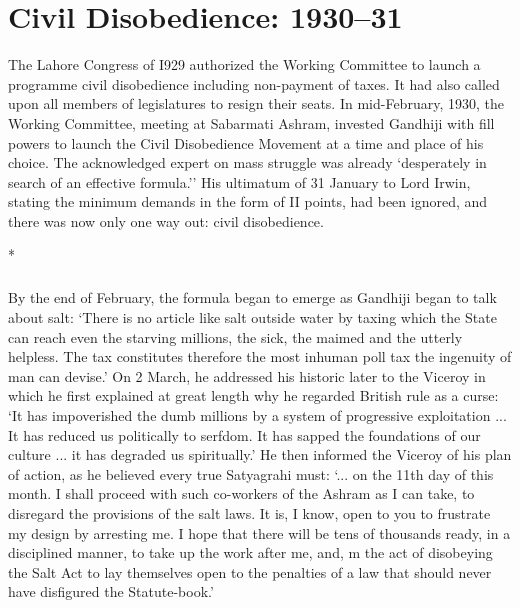 \chapter{Civil Disobedience: 1930--31}
\begin{multicols}{2}

The Lahore Congress of I929 authorized the Working Committee to launch a programme civil disobedience including non-payment of taxes. It had also called upon all members of legislatures to resign their seats. In mid-February, 1930, the Working Committee, meeting at Sabarmati Ashram, invested Gandhiji with fill powers to launch the Civil Disobedience Movement at a time and place of his choice. The acknowledged expert on mass struggle was already `desperately in search of an effective formula.'' His ultimatum of 31 January to Lord Irwin, stating the minimum demands in the form of II points, had been ignored, and there was now only one way out: civil disobedience.

\begin{center}*\end{center}

\paragraph*{}

By the end of February, the formula began to emerge as Gandhiji began to talk about salt: `There is no article like salt outside water by taxing which the State can reach even the starving millions, the sick, the maimed and the utterly helpless. The tax constitutes therefore the most inhuman poll tax the ingenuity of man can devise.' On 2 March, he addressed his historic later to the Viceroy in which he first explained at great length why he regarded British rule as a curse: `It has impoverished the dumb millions by a system of progressive exploitation ... It has reduced us politically to serfdom. It has sapped the foundations of our culture ... it has degraded us spiritually.' He then informed the Viceroy of his plan of action, as he believed every true Satyagrahi must: `... on the 11th day of this month. I shall proceed with such co-workers of the Ashram as I can take, to disregard the provisions of the salt laws. It is, I know, open to you to frustrate my design by arresting me. I hope that there will be tens of thousands ready, in a disciplined manner, to take up the work after me, and, m the act of disobeying the Salt Act to lay themselves open to the penalties of a law that should never have disfigured the Statute-book.'


\end{multicols}
